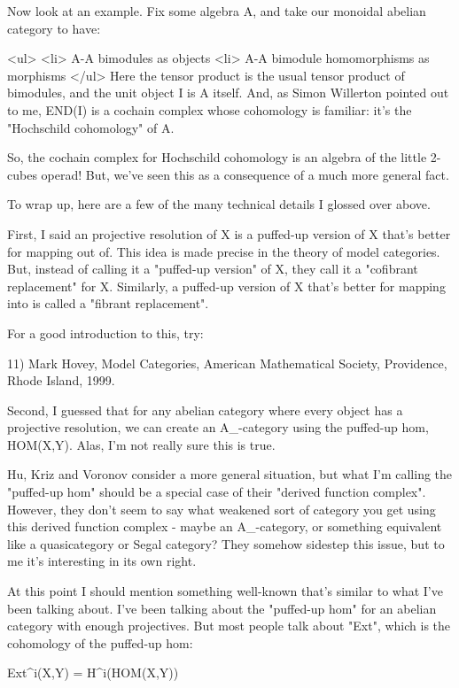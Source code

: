 Now look at an example.  Fix some algebra A, and take our 
monoidal abelian category to have:

<ul>
<li>
    A-A bimodules as objects
<li>
    A-A bimodule homomorphisms as morphisms
</ul>
Here the tensor product is the usual tensor product of bimodules,
and the unit object I is A itself.  And, as Simon Willerton pointed 
out to me, END(I) is a cochain complex whose cohomology is familiar: 
it's the "Hochschild cohomology" of A.   

So, the cochain complex for Hochschild cohomology is an algebra of 
the little 2-cubes operad!  But, we've seen this as a consequence 
of a much more general fact.

To wrap up, here are a few of the many technical details I glossed
over above.

First, I said an projective resolution of X is a puffed-up version of X
that's better for mapping out of.  This idea is made precise in the
theory of model categories.  But, instead of calling it a
"puffed-up version" of X, they call it a "cofibrant
replacement" for X.  Similarly, a puffed-up version of X that's
better for mapping into is called a "fibrant replacement".

For a good introduction to this, try:

11) Mark Hovey, Model Categories, American Mathematical Society,
Providence, Rhode Island, 1999.

Second, I guessed that for any abelian category where every object has
a projective resolution, we can create an A_{\infty }-category
using the puffed-up hom, HOM(X,Y).  Alas, I'm not really sure this is true.

Hu, Kriz and Voronov consider a more general situation, but
what I'm calling the "puffed-up hom" should be a special case of their
"derived function complex".  However, they don't seem to say
what weakened sort of category you get using this
derived function complex - maybe an A_{\infty }-category, or
something equivalent like a quasicategory or Segal category?  They
somehow sidestep this issue, but to me it's interesting in its
own right.

At this point I should mention something well-known that's similar
to what I've been talking about.  I've been talking about the 
"puffed-up hom" for an abelian category with enough projectives.   
But most people talk about "Ext", which is the cohomology of the 
puffed-up hom:

Ext^{i}(X,Y) = H^{i}(HOM(X,Y))

